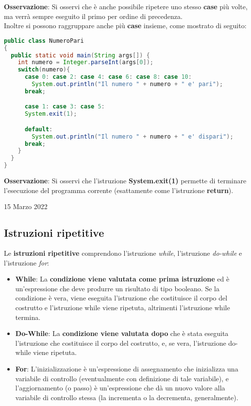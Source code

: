 \documentclass[a4paper]{extarticle}
\begin{document}
\vspace{1em}
\noindent
\textbf{Osservazione}: Si osservi che è anche possibile ripetere uno stesso \textbf{case} più volte, ma verrà sempre eseguito il primo per ordine di precedenza.\\
Inoltre si possono raggruppare anche più \textbf{case} insieme, come mostrato di seguito:

\vspace{1em}
\noindent
\begin{lstlisting}[language=Java, caption=Esempio di multiple-case switch in Java]
public class NumeroPari
{
  public static void main(String args[]) {
    int numero = Integer.parseInt(args[0]);
    switch(numero){
      case 0: case 2: case 4: case 6: case 8: case 10:
        System.out.println("Il numero " + numero + " e' pari");
      break;

      case 1: case 3: case 5:
      System.exit(1);

      default:
        System.out.println("Il numero " + numero + " e' dispari");
      break;
    }
  }
}
\end{lstlisting}

\vspace{1em}
\noindent
\textbf{Osservazione}: Si osservi che l'istruzione \textbf{System.exit(1)} permette di terminare l'esecuzione del programma corrente (esattamente come l'istruzione \textbf{return}).

\newpage
\noindent
\begin{center}
  15 Marzo 2022
\end{center}
\subsection{Istruzioni ripetitive}
Le \textbf{istruzioni ripetitive} comprendono l’istruzione \emph{while}, l’istruzione \emph{do-while} e l’istruzione \emph{for}:
\begin{itemize}
  \item \textbf{While}: La \textbf{condizione viene valutata come prima istruzione} ed è un’espressione che deve produrre un risultato di tipo booleano. Se la condizione è vera, viene eseguita l’istruzione che costituisce il corpo del costrutto e l’istruzione while viene ripetuta, altrimenti l’istruzione while termina.

  \item \textbf{Do-While}: La \textbf{condizione viene valutata dopo} che è stata eseguita l’istruzione che costituisce il corpo del costrutto, e, se vera, l’istruzione do-while viene ripetuta.

  \item \textbf{For}: L'inizializzazione è un’espressione di assegnamento che inizializza una variabile di controllo (eventualmente con definizione di tale variabile), e l’aggiornamento (o passo) è un’espressione che dà un nuovo valore alla variabile di controllo stessa (la incrementa o la decrementa, generalmente).
\end{itemize}
\end{document}

